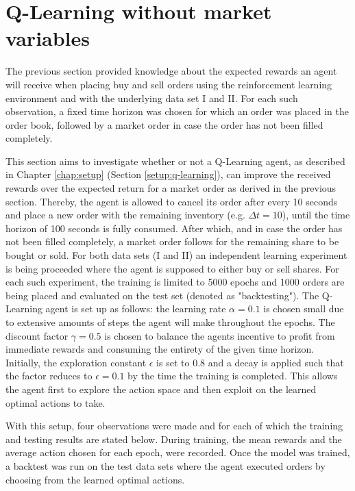 \section{Q-Learning without market variables}
\label{sec:eval-qlearn}
The previous section provided knowledge about the expected rewards an agent will receive when placing buy and sell orders using the reinforcement learning environment and with the underlying data set I and II.
For each such observation, a fixed time horizon was chosen for which an order was placed in the order book, followed by a market order in case the order has not been filled completely.

This section aims to investigate whether or not a Q-Learning agent, as described in Chapter \ref{chap:setup} (Section \ref{setup:q-learning}), can improve the received rewards over the expected return for a market order as derived in the previous section.
Thereby, the agent is allowed to cancel its order after every 10 seconds and place a new order with the remaining inventory (e.g. $\Delta{t}=10$), until the time horizon of 100 seconds is fully consumed.
After which, and in case the order has not been filled completely, a market order follows for the remaining share to be bought or sold.
For both data sets (I and II) an independent learning experiment is being proceeded where the agent is supposed to either buy or sell shares.
For each such experiment, the training is limited to 5000 epochs and 1000 orders are being placed and evaluated on the test set (denoted as "backtesting").
The Q-Learning agent is set up as follows:
the learning rate $\alpha=0.1$ is chosen small due to extensive amounts of steps the agent will make throughout the epochs.
The discount factor $\gamma=0.5$ is chosen to balance the agents incentive to profit from immediate rewards and consuming the entirety of the given time horizon.
Initially, the exploration constant $\epsilon$ is set to 0.8 and a decay is applied such that the factor reduces to $\epsilon=0.1$ by the time the training is completed.
This allows the agent first to explore the action space and then exploit on the learned optimal actions to take.

With this setup, four observations were made and for each of which the training and testing results are stated below.
During training, the mean rewards and the average action chosen for each epoch, were recorded.
Once the model was trained, a backtest was run on the test data sets where the agent executed orders by choosing from the learned optimal actions.

